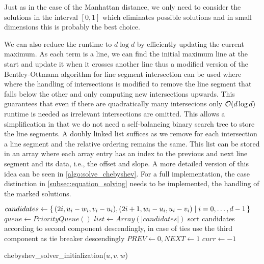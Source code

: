 Just as in the case of the Manhattan distance, we only need to consider the solutions in the interval \([0,1]\) which eliminates possible solutions and in small dimensions this is probably the best choice. 

We can also reduce the runtime to \(d \log d\) by efficiently updating the current maximum. As each term is a line, we can find the initial maximum line at the start and update it when it crosses another line thus a modified version of the Bentley-Ottmann algorithm for line segment intersection can be used where where the handling of intersections is modified to remove the line segment that falls below the other and only computing new intersections upwards. This guarantees that even if there are quadratically many intersecions only \(\mathcal{O}(d \log d)\) runtime is needed as irrelevant intersections are omitted. 
This allows a simplification in that we do not need a self-balancing binary search tree to store the line segments. A doubly linked list suffices as we remove for each intersection a line segment and the relative ordering remains the same. This list can be stored in an array where each array entry has an index to the previous and next line segment and its data, i.e., the offset and slope. A more detailed version of this idea can be seen in \cref{algo:solve_chebyshev}. For a full implementation, the case distinction in \cref{subsec:equation_solving} needs to be implemented, the handling of the marked solutions.

\begin{algorithm}[ht]
  \DontPrintSemicolon
  \BlankLine
  \(candidates \gets \set{(2i, u_i - w_i, v_i - u_i), (2i+1, w_i - u_i, u_i - v_i) | i = 0, \dots, d - 1}\) \;
  \(queue \gets PriorityQueue()\) \;
  \(list \gets Array(|candidates|)\) \;
  sort candidates according to second component descendingly,
  in case of ties use the third component as tie breaker descendingly \;
  \(PREV \gets 0, NEXT \gets 1\) 
  \(curr \gets -1\) \;

  \caption{chebyshev\_solver\_initialization(\(u, v, w\))}
  \label{algo:solve_chebyshev_init}
\end{algorithm}

